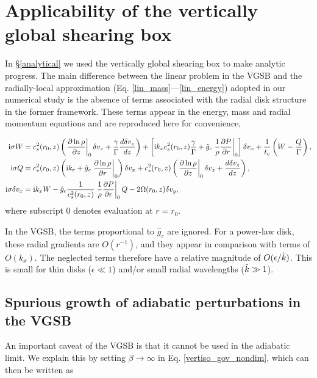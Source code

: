 \section{Applicability of the vertically global shearing box}\label{global_corr}
In \S\ref{analytical} we used the vertically global shearing box
\citep[VGSB,][]{mcnally14} to make analytic progress.   
The main difference between the linear problem in the VGSB 
and the radially-local approximation
(Eq. \ref{lin_mass}---\ref{lin_energy}) adopted in our numerical study
is the absence of  terms associated with the radial disk structure in
the former framework. These terms appear in the energy, mass and radial momentum
equations and are reproduced here for convenience,

\begin{align}
  \mathrm{i} \sigma W  &=c _s^2(r_0, z)\left( \left.\frac{\partial\ln\rho}{\partial
      z}\right|_0 \delta v_z + \frac{\gamma}{\Gamma} \frac{d\delta
    v_z}{dz}\right) + \left[\mathrm{i} k_xc_s^2(r_0,z)
  \frac{\gamma}{\Gamma} + \hat{g}_c\left.\frac{1}{\rho}\frac{\partial P}{\partial
      r}\right|_0\right]\delta v_x  +
\frac{1}{t_c}\left(W-\frac{Q}{\Gamma}\right),\label{gcorr_terms1}\\
\mathrm{i} \sigma Q &= c_s^2(r_0,z)\left(\mathrm{i} k_r + \hat{g}_c
  \left.\frac{\partial\ln{\rho}}{\partial r}\right|_0\right)\delta v_x + c _s^2(r_0, z)\left( \left.\frac{\partial\ln\rho}{\partial
      z}\right|_0 \delta v_z + \frac{d\delta
    v_z}{dz}\right),\label{gcorr_terms2} \\
\mathrm{i} \sigma \delta v_x & = \mathrm{i} k_x W  -
\hat{g}_c\frac{1}{c_s^2(r_0,z)}\left.\frac{1}{\rho}\frac{\partial P}{\partial
  r}\right|_0Q - 2\Omega(r_0,z)\delta v_y,\label{gcorr_terms3}
\end{align}
where subscript $0$ denotes evaluation at $r=r_0$.

In the VGSB, the terms proportional to $\hat{g}_c$ are ignored. For a
power-law disk, these radial gradients are $O(r^{-1})$, and they
appear in comparison with terms of $O(k_x)$. The neglected terms 
therefore have a relative magnitude of $O(\epsilon/\hat{k})$. This is
small for thin disks ($\epsilon\ll1$) and/or small radial wavelengths
($\hat{k}\gg 1$). 


\subsection{Spurious growth of adiabatic perturbations in the VGSB}\label{analytic_adia} 
An important caveat of the VGSB is that it cannot be used in the
adiabatic limit. We explain this by setting  $\beta\to\infty$ in
Eq. \ref{vertiso_gov_nondim}, which can then be written as 

